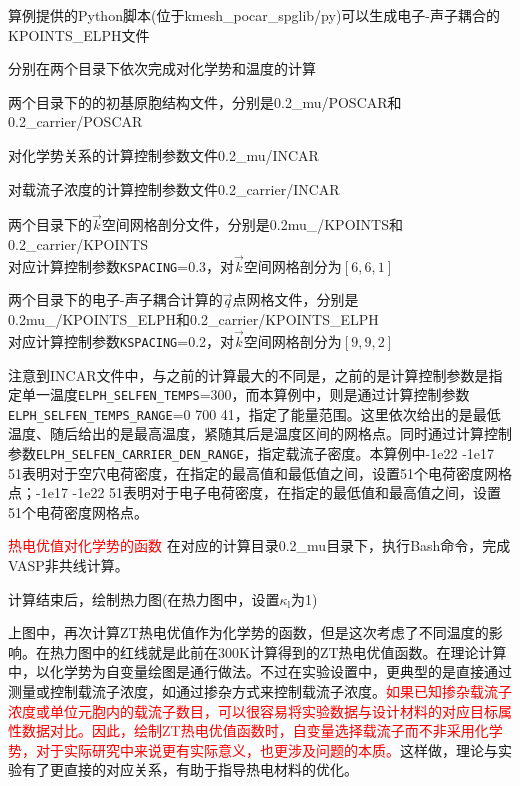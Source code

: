 算例提供的\textrm{Python}脚本(位于\textrm{kmesh\_pocar\_spglib/py})可以生成电子-声子耦合的\textrm{KPOINTS\_ELPH}文件


分别在两个目录下依次完成对化学势和温度的计算

两个目录下的的初基原胞结构文件，分别是\textrm{0.2\_mu/POSCAR}和\textrm{0.2\_carrier/POSCAR}

对化学势关系的计算控制参数文件\textrm{0.2\_mu/INCAR}

对载流子浓度的计算控制参数文件\textrm{0.2\_carrier/INCAR}

两个目录下的$\vec k$空间网格剖分文件，分别是\textrm{0.2mu\_/KPOINTS}和\textrm{0.2\_carrier/KPOINTS}\\
对应计算控制参数\texttt{KSPACING}=0.3，对$\vec k$空间网格剖分为$[6,6,1]$

两个目录下的电子-声子耦合计算的$\vec q$点网格文件，分别是\textrm{0.2mu\_/KPOINTS\_ELPH}和\textrm{0.2\_carrier/KPOINTS\_ELPH}\\
对应计算控制参数\texttt{KSPACING}=0.2，对$\vec k$空间网格剖分为$[9,9,2]$

注意到\textrm{INCAR}文件中，与之前的计算最大的不同是，之前的是计算控制参数是指定单一温度\texttt{ELPH\_SELFEN\_TEMPS}=300，而本算例中，则是通过计算控制参数\texttt{ELPH\_SELFEN\_TEMPS\_RANGE}=0 700 41，指定了能量范围。这里依次给出的是最低温度、随后给出的是最高温度，紧随其后是温度区间的网格点。同时通过计算控制参数\texttt{ELPH\_SELFEN\_CARRIER\_DEN\_RANGE}，指定载流子密度。本算例中\textrm{-1e22 -1e17 51}表明对于空穴电荷密度，在指定的最高值和最低值之间，设置51个电荷密度网格点；\textrm{-1e17 -1e22 51}表明对于电子电荷密度，在指定的最低值和最高值之间，设置51个电荷密度网格点。

\textcolor{red}{热电优值对化学势的函数}
在对应的计算目录\textrm{0.2\_mu}目录下，执行\textrm{Bash}命令，完成\textrm{VASP}非共线计算。

计算结束后，绘制热力图(在热力图中，设置$\kappa_{\mathrm{l}}$为1)

上图中，再次计算\textrm{ZT}热电优值作为化学势的函数，但是这次考虑了不同温度的影响。在热力图中的红线就是此前在\textrm{300K}计算得到的\textrm{ZT}热电优值函数。在理论计算中，以化学势为自变量绘图是通行做法。不过在实验设置中，更典型的是直接通过测量或控制载流子浓度，如通过掺杂方式来控制载流子浓度。\textcolor{red}{如果已知掺杂载流子浓度或单位元胞内的载流子数目，可以很容易将实验数据与设计材料的对应目标属性数据对比。}\textcolor{red}{因此，绘制\textrm{ZT}热电优值函数时，自变量选择载流子而不非采用化学势，对于实际研究中来说更有实际意义，也更涉及问题的本质。}这样做，理论与实验有了更直接的对应关系，有助于指导热电材料的优化。

